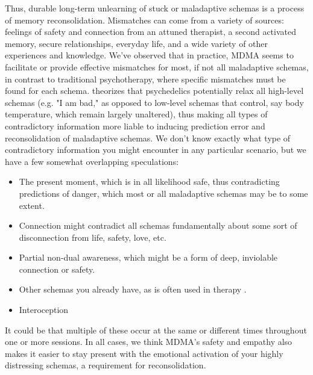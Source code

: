 \documentclass[12pt,letterpaper]{book}
\begin{document}
Thus, durable long-term unlearning of stuck or maladaptive schemas is a process of memory reconsolidation. Mismatches can come from a variety of sources: feelings of safety and connection from an attuned therapist, a second activated memory, secure relationships, everyday life, and a wide variety of other experiences and knowledge. We've observed that in practice, MDMA seems to facilitate or provide effective mismatches for most, if not all maladaptive schemas, in contrast to traditional psychotherapy, where specific mismatches must be found for each schema. \textcite{carhart2019rebus} theorizes that psychedelics potentially relax all high-level schemas (e.g. "I am bad," as opposed to low-level schemas that control, say body temperature, which remain largely unaltered), thus making all types of contradictory information more liable to inducing prediction error and reconsolidation of maladaptive schemas. We don't know exactly what type of contradictory information you might encounter in any particular scenario, but we have a few somewhat overlapping speculations:
\begin{itemize}
	\item The present moment, which is in all likelihood safe, thus contradicting predictions of danger, which most or all maladaptive schemas may be to some extent.
	\item Connection might contradict all schemas fundamentally about some sort of disconnection from life, safety, love, etc.
	\item Partial non-dual awareness, which might be a form of deep, inviolable connection or safety.
	\item Other schemas you already have, as is often used in therapy \cite{eckerUnlocking}.
	\item Interoception \cite{carhart2019rebus}
\end{itemize}
It could be that multiple of these occur at the same or different times throughout one or more sessions. In all cases, we think MDMA's safety and empathy also makes it easier to stay present with the emotional activation of your highly distressing schemas, a requirement for reconsolidation.
\end{document}
